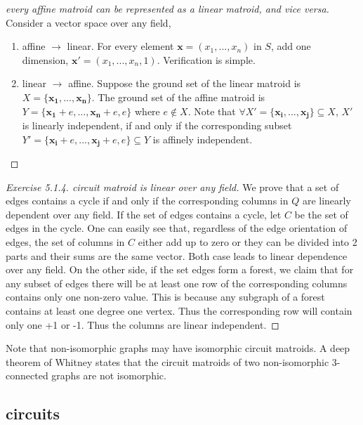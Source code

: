 \begin{proof}[every affine matroid can be represented as a linear matroid, and vice versa]
    $ $\newline
    Consider a vector space over any field,
    \begin{enumerate}
        \item affine $\to$ linear. For every element $\mathbf{x}=(x_1,...,x_n)$ in $S$, add one dimension, $\mathbf{x'}=(x_1,...,x_n,1)$. Verification is simple.
        \item linear $\to$ affine. Suppose the ground set of the linear matroid is $X=\{\mathbf{x_1},...,\mathbf{x_n}\}$. The ground set of the affine matroid is $Y=\{\mathbf{x_1}+e,\dots,\mathbf{x_n}+e,e\}$ where $e\notin X$. Note that $\forall X'=\{\mathbf{x_i},...,\mathbf{x_j}\}\subseteq X$, $X'$ is linearly independent, if and only if the corresponding subset $Y'=\{\mathbf{x_i}+e,...,\mathbf{x_j}+e,e\}\subseteq Y$ is affinely independent.
    \end{enumerate}
\end{proof}
\begin{proof}[Exercise 5.1.4. circuit matroid is linear over any field]
    We prove that a set of edges contains a cycle if and only if the corresponding columns in $Q$ are linearly dependent over any field. If the set of edges contains a cycle, let $C$ be the set of edges in the cycle. One can easily see that, regardless of the edge orientation of edges, the set of columns in $C$ either add up to zero or they can be divided into 2 parts and their sums are the same vector. Both case leads to linear dependence over any field. On the other side, if the set edges form a forest, we claim that for any subset of edges there will be at least one row of the corresponding columns contains only one non-zero value. This is because any subgraph of a forest contains at least one degree one vertex. Thus the corresponding row will contain only one +1 or -1. Thus the columns are linear independent. 

\end{proof}

Note that non-isomorphic graphs may have isomorphic circuit matroids. A deep theorem of
Whitney states that the circuit matroids of two non-isomorphic 3-connected graphs
are not isomorphic.

\subsection{circuits}

